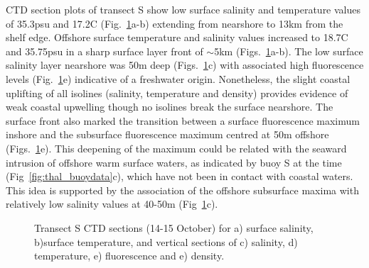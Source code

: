 CTD section plots of transect S show low surface salinity and
temperature values of 35.3psu and 17.2\deg C
(Fig.~\ref{fig:thalCTD_S}a-b) extending from nearshore to 13km
from the shelf edge. Offshore surface temperature and salinity
values increased to 18.7\deg C and 35.75psu in a sharp surface
layer front of $\sim$5km (Figs.~\ref{fig:thalCTD_S}a-b). The low
surface salinity layer nearshore was 50m deep
(Figs.~\ref{fig:thalCTD_S}c) with associated high fluorescence
levels (Fig.~\ref{fig:thalCTD_S}e) indicative of a freshwater
origin. Nonetheless, the slight coastal uplifting of all isolines
(salinity, temperature and density) provides evidence of weak
coastal upwelling though no isolines break the surface nearshore.
The surface front also marked the transition between a surface
fluorescence maximum inshore and the subsurface fluorescence
maximum centred at 50m offshore (Figs.~\ref{fig:thalCTD_S}e). This
deepening of the maximum could be related with the seaward
intrusion of offshore warm surface waters, as indicated by buoy S
at the time (Fig~\ref{fig:thal_buoydata}c), which have not been in
contact with coastal waters. This idea is supported by the
association of the offshore subsurface maxima with relatively low
salinity values at 40-50m (Fig~\ref{fig:thalCTD_S}c).
\begin{figure}[t]
\arribacap \centering %
\hspace{0.2cm}
\quad%
\subfigure[]{\texttt{[image: S\_S]}}%
\subfigure[]{\texttt{[image: S\_T]}}\quad%
\subfigure[]{\texttt{[image: S\_F]}}%
\subfigure[]{\texttt{[image: S\_D]}}%
\caption{Transect S CTD sections (14-15 October) for a) surface
salinity, b)surface temperature, and vertical sections of c)
salinity, d) temperature, e) fluorescence and e) density.}
\label{fig:thalCTD_S}
\end{figure}

